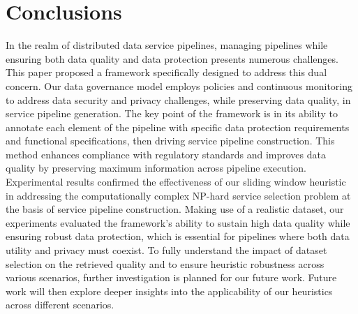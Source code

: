 \documentclass[sn-mathphys-num,referee]{sn-jnl}
\theoremstyle{definition}
\begin{document}











\section{Conclusions}\label{sec:conclusions}
In the realm of distributed data service pipelines, managing pipelines while ensuring both data quality and data protection presents numerous challenges. This paper proposed a framework specifically designed to address this dual concern. Our data governance model employs policies and continuous monitoring to address data security and privacy challenges, while preserving data quality, in service pipeline generation. The key point of the framework is in its ability to annotate each element of the pipeline with specific data protection requirements and functional specifications, then driving service pipeline construction. This method enhances compliance with regulatory standards and improves data quality by preserving maximum information across pipeline execution. Experimental results confirmed the effectiveness of our sliding window heuristic in addressing the computationally complex NP-hard service selection problem at the basis of service pipeline construction. Making use of a realistic dataset, our experiments evaluated the framework's ability to sustain high data quality while ensuring robust data protection, which is essential for pipelines where both data utility and privacy must coexist. To fully understand the impact of dataset selection on the retrieved quality and to ensure heuristic robustness across various scenarios, further investigation is planned for our future work. Future work will then %
explore deeper insights into the applicability of our heuristics across different scenarios.



\clearpage
\end{document}
